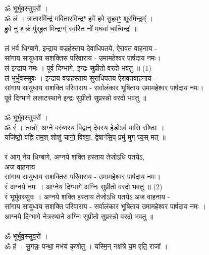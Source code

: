 \subsection{}
ॐ भूर्भुव॒स्सुव॒रों ।\\
ॐ लं । त्रातारमिंन्द्र॑ मवि॒तार॒मिन्द्रꣳ हवे॑ हवे सु॒हव॒ꣳ॒ शूर॒मिन्द्रम्᳚ । \\
हु॒वे नु श॒क्रं पु॑रहू॒त मिन्द्रग्ग्॑ स्व॒स्ति नो॑ म॒घवा॑ धा॒त्विन्द्रः॑ ॥\\
\\
लं भर्व धिग्बागे, इन्द्राय वज्रर्हस्ताय देवाधिपतये, ऐरावत वाहनाय - \\
सांगाय सायुधाय सशक्तिस परिवाराय -  उमामहेश्वर पार्षदाय नमः।\\
लं इन्द्राय नमः ।  पूर्व दिग्भागे, इन्द्रः सुप्रीतो  वरदो भवतु ॥  (1)\\
{\small लं भूर्भुवस्सुवः । इन्द्राय वज्रहस्ताय सुराधिपतय ऐरावतवाहनाय -\\
सांगाय सायुधाय सशक्ति परिवाराय - सर्वालंकार भूषिताय उमामहेश्वर पार्षदाय नमः।\\
पूर्व दिग्भागे ललाटस्थाने इन्द्रः सुप्रीतो सुप्रस्न्नो वरदो भवतु ॥}\\
\\
ॐ भूर्भुव॒स्सुव॒रों ।\\
{\small ॐ} रं । त्वन्नो॑, अग्ने॒ वरु॑णस्य वि॒द्वान् दे॒वस्य॒ हेडोऽव॑ यासि सीष्ठाः ।\\
यजि॑ष्ठो॒  वह्नि॑ तम॒श् शोशु॑ चानो॒ विश्वा॒, द्वेषाꣳ॑सि॒प् प्रमु॑ मुग् घ्य॒स् मत् ॥ \\
\\
रं आग् नेय धिग्बागे, अग्नये शक्ति हस्ताय तेजोऽधि पतयेऽ,\\
\hspace*{10cm} अज वाहनाय\\
सांगाय सायुधाय सशक्तिस परिवाराय - उमामहेश्वर पार्षदाय नमः।\\
रं अग्नये नमः । आग्नेय दिग्भागे अग्निः सुप्रीतो  वरदो भवतु ॥ (2)\\
{\small रं भूर्भुवस्सुवः । अग्नये शक्ति हस्ताय तेजोऽधि पतयेऽ अज वाहनाय -\\
सांगाय सायुधाय सशक्ति परिवाराय - सर्वालंकार भूषिताय उमामहेश्वर पार्षदाय नमः ।\\
आग्नये दिग्भागे नेत्रस्थाने अग्निः सुप्रीतो सुप्रस्न्नो वरदो भवतु ॥}\\
\\
ॐ भूर्भुव॒स्सुव॒रों ।\\
{\small ॐ} हं । सु॒गन्नः॒ पन्था॒ मभ॑यं कृणोतु । यस्मि॒न् नक्ष॑त्रे य॒म एति॒ राजा᳚ ।\\
